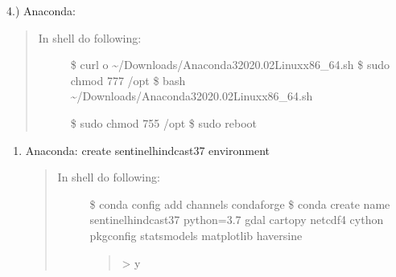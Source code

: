 \documentclass[letterpaper,10pt,english]{sphinxmanual}
\begin{document}
4.) Anaconda: 
\begin{quote}
\begin{description}
\item[{In shell do following:}] \leavevmode
\$ curl  \sphinxhyphen{}o \textasciitilde{}/Downloads/Anaconda3\sphinxhyphen{}2020.02\sphinxhyphen{}Linux\sphinxhyphen{}x86\_64.sh
\$ sudo chmod 777 /opt
\$ bash \textasciitilde{}/Downloads/Anaconda3\sphinxhyphen{}2020.02\sphinxhyphen{}Linux\sphinxhyphen{}x86\_64.sh

\begin{sphinxVerbatim}[commandchars=\\\{\}]
\PYG{p}{[}\PYG{p}{]}
\end{sphinxVerbatim}

\$ sudo chmod 755 /opt
\$ sudo reboot

\end{description}
\end{quote}
\begin{enumerate}
%
\setcounter{enumi}{4}
\item {} 
Anaconda: create sentinel\sphinxhyphen{}hindcast\sphinxhyphen{}37 environment
\begin{quote}
\begin{description}
\item[{In shell do following:}] \leavevmode
\$ conda config \textendash{}add channels conda\sphinxhyphen{}forge
\$ conda create \textendash{}name sentinel\sphinxhyphen{}hindcast\sphinxhyphen{}37 python=3.7 gdal cartopy netcdf4 cython pkgconfig statsmodels matplotlib haversine
\begin{quote}

\textgreater{} y
\end{quote}

\end{description}
\end{quote}

\end{enumerate}
\end{document}
